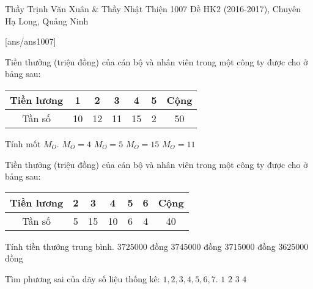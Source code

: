 \begin{name}
{Thầy Trịnh Văn Xuân \& Thầy Nhật Thiện}
{1007 Đề HK2 (2016-2017), Chuyên Hạ Long, Quảng Ninh}
\end{name}
\setcounter{ex}{0}
[ans/ans1007]
\begin{ex}%
Tiền thưởng (triệu đồng) của cán bộ và nhân viên trong một công ty được cho ở bảng sau:
\begin{center}
\begin{tabular}{|c|c|c|c|c|c|c|}
\hline 
Tiền lương	&1	&2	&3	&4	&5	&Cộng\\
\hline 
Tần số	&10	&12	&11	&15	&2	&50 \\
\hline 
\end{tabular}
\end{center}
Tính mốt $M_O.$
\choice
{\True $M_O=4$}
{$M_O=5$}
{$M_O=15$}
{$M_O=11$}
\end{ex}

\begin{ex}%
Tiền thưởng (triệu đồng) của cán bộ và nhân viên trong một công ty được cho ở bảng sau:
\begin{center}
\begin{tabular}{|c|c|c|c|c|c|c|}
\hline 
Tiền lương	&2	&3	&4	&5	&6	&Cộng\\
\hline
Tần số	&5	&15	&10	&6	&4	&40\\
\hline 
\end{tabular}
\end{center}
Tính tiền thưởng trung bình.
\choice
{\True $3725000$ đồng}
{$3745000$ đồng}
{$3715000$ đồng}
{$3625000$ đồng}
\end{ex}

\begin{ex}%
Tìm phương sai của dãy số liệu thống kê: $1, 2, 3, 4, 5, 6, 7$.
\choice
{$1$}
{$2$}
{$3$}
{\True $4$}
\end{ex}

